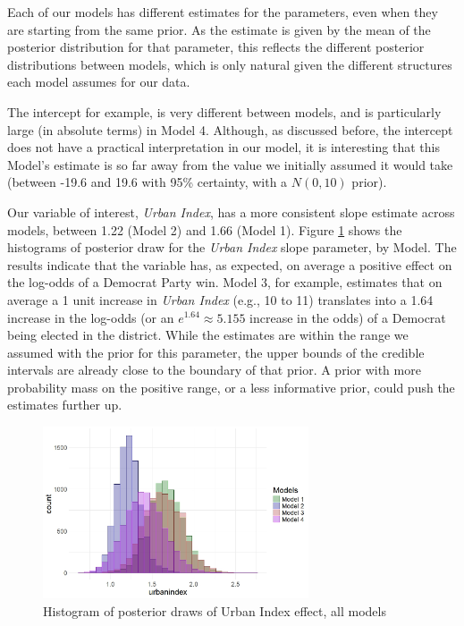 \documentclass[12pt]{article}
\begin{document}


Each of our models has different estimates for the parameters, even when they are starting from the same prior.
As the estimate is given by the mean of the posterior distribution for that parameter, this reflects the different posterior distributions between models, which is only natural given the different structures each model assumes for our data.

The intercept for example, is very different between models, and is particularly large (in absolute terms) in Model 4. Although, as discussed before, the intercept does not have a practical interpretation in our model, it is interesting that this Model's estimate is so far away from the value we initially assumed it would take (between -19.6 and 19.6 with 95\% certainty, with a $N(0,10)$ prior).

Our variable of interest, \textit{Urban Index}, has a more consistent slope estimate across models, between 1.22 (Model 2) and 1.66 (Model 1).
Figure \ref{fig:urbanindex_estimates} shows the histograms of posterior draw for the \textit{Urban Index} slope parameter, by Model.
The results indicate that the variable has, as expected, on average a positive effect on the log-odds of a Democrat Party win.
Model 3, for example, estimates that on average a 1 unit increase in \textit{Urban Index} (e.g., 10 to 11) translates into a 1.64 increase in the log-odds (or an $e^{1.64} \approx 5.155 $ increase in the odds) of a Democrat being elected in the district.
While the estimates are within the range we assumed with the prior for this parameter, the upper bounds of the credible intervals are already close to the boundary of that prior. 
A prior with more probability mass on the positive range, or a less informative prior, could push the estimates further up.

\begin{figure}
	\centering
	\includegraphics[width=0.7\textwidth]{results/urb_post_all_models.jpeg}
	\caption{Histogram of posterior draws of Urban Index effect, all models}
	\label{fig:urbanindex_estimates}
\end{figure}
\end{document}
